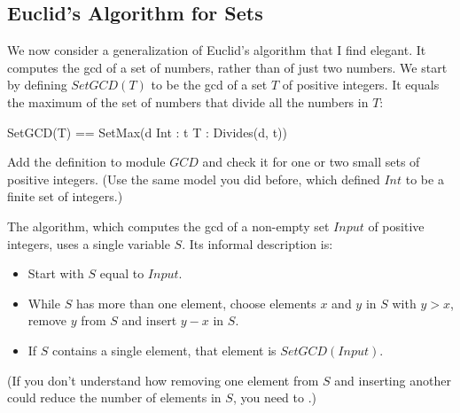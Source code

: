%
\vspace{-\baselineskip}
\subsection{Euclid's Algorithm for Sets}

We now consider a generalization of Euclid's algorithm that I find
elegant.  It computes the gcd of a set of numbers, rather than of just
two numbers.  We start by defining $SetGCD(T)$ to be the gcd of a set
$T$ of positive integers.  It equals the maximum of the set of numbers
that divide all the numbers in $T$:
\begin{display}
\begin{notla}
SetGCD(T) == SetMax({d \in Int : \A t \in T : Divides(d, t)})
\end{notla}\midcol
\begin{tlatex}
\end{tlatex}
\end{display}
Add the definition to module $GCD$ and check it for one or two small
sets of positive integers.  (Use the same model you did before, which
defined $Int$ to be a finite set of integers.)

The algorithm, which computes the gcd of a non-empty set $Input$ of positive
integers, uses a single variable $S$.  Its informal description is:
\begin{itemize}
\item Start with $S$ equal to $Input$.

\item While $S$ has more than one element, choose elements $x$ and $y$
in $S$ with $y > x$, remove $y$ from $S$ and insert $y-x$ in $S$.

\item If $S$ contains a single element, that element is $SetGCD(Input)$.
\end{itemize}
(If you don't understand how removing  one element from $S$ and inserting
another could reduce the number of elements in $S$, you need to
.)

